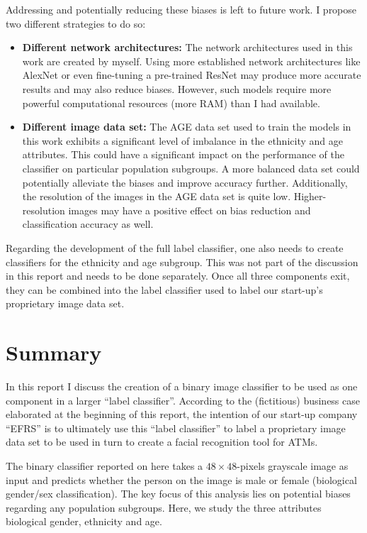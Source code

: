 \documentclass{article}
\begin{document}
Addressing and potentially reducing these biases is left to future work. I propose two different strategies to do so:
\begin{itemize}
\item \textbf{Different network architectures:} The network architectures used in this work are created by myself. Using more established network architectures like AlexNet \citep{Krizhevsky+2017} or even fine-tuning a pre-trained ResNet \citep{He2015DeepRL} may produce more accurate results and may also reduce biases. However, such models require more powerful computational resources (more RAM) than I had available.
\item \textbf{Different image data set:} The AGE data set used to train the models in this work exhibits a significant level of imbalance in the ethnicity and age attributes. This could have a significant impact on the performance of the classifier on particular population subgroups. A more balanced data set could potentially alleviate the biases and improve accuracy further.
Additionally, the resolution of the images in the AGE data set is quite low. Higher-resolution images may have a positive effect on bias reduction and classification accuracy as well.
\end{itemize}

Regarding the development of the full label classifier, one also needs to create classifiers for the ethnicity and age subgroup. This was not part of the discussion in this report and needs to be done separately. Once all three components exit, they can be combined into the label classifier used to label our start-up's proprietary image data set.

\section{Summary}
In this report I discuss the creation of a binary image classifier to be used as one component in a larger ``label classifier''. According to the (fictitious) business case elaborated at the beginning of this report, the intention of our start-up company ``EFRS'' is to ultimately use this ``label classifier'' to label a proprietary image data set to be used in turn to create a facial recognition tool for ATMs.

The binary classifier reported on here takes a $48\times48$-pixels grayscale image as input and predicts whether the person on the image is male or female (biological gender/sex classification). The key focus of this analysis lies on potential biases regarding any population subgroups. Here, we study the three attributes biological gender, ethnicity and age.
\end{document}
